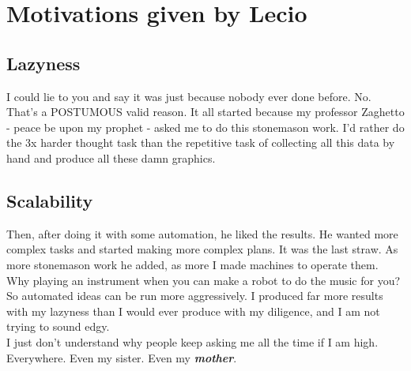 \chapter{Motivations given by Lecio}
\section{Lazyness}
\indent I could lie to you and say it was just because nobody ever done before. No. That's a POSTUMOUS valid reason. It all started because my professor Zaghetto - peace be upon my prophet - asked me to do this stonemason work. I'd rather do the 3x harder thought task than the repetitive task of collecting all this data by hand and produce all these damn graphics.
\section{Scalability}
\indent Then, after doing it with some automation, he liked the results. He wanted more complex tasks and started making more complex plans. It was the last straw. As more stonemason work he added, as more I made machines to operate them. Why playing an instrument when you can make a robot to do the music for you?\\
\indent So automated ideas can be run more aggressively. I produced far more results with my lazyness than I would ever produce with my diligence, and I am not trying to sound edgy.\\

\indent I just don't understand why people keep asking me all the time if I am high. Everywhere. Even my sister. Even my \textbf{\textit{mother}}.
